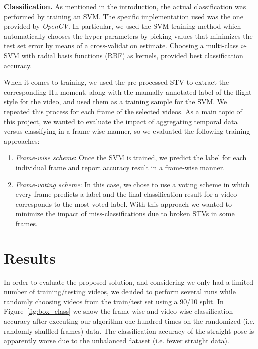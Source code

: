 \documentclass[a4paper, textwidth=18cm, textheight=24cm, top=1cm, bottom=1cm, left=1cm, right=1cm10pt]{article}
\begin{document}
\textbf{Classification.} As mentioned in the introduction, the actual classification was performed by training an SVM. The specific implementation used was the one provided by \emph{OpenCV}. In particular, we used the SVM training method which automatically chooses the hyper-parameters by picking values that minimizes the test set error by means of a cross-validation estimate. Choosing a multi-class $\nu$-SVM with radial basis functions (RBF) as kernels, provided best classification accuracy.

When it comes to training, we used the pre-processed STV to extract the corresponding Hu moment, along with the manually annotated label of the flight style for the video, and used them as a training sample for the SVM. We repeated this process for each frame of the selected videos. 
As a main topic of this project, we wanted to evaluate the impact of aggregating temporal data versus classifying in a frame-wise manner, so we evaluated the following training approaches:
\begin{enumerate}[nosep]
\item \emph{Frame-wise scheme}: Once the SVM is trained, we predict the label for each individual frame and report accuracy result in a frame-wise manner.
\item \emph{Frame-voting scheme}: In this case, we chose to use a voting scheme in which every frame predicts a label and the final classification result for a video corresponds to the most voted label. With this approach we wanted to minimize the impact of miss-classifications due to broken STVs in some frames. 
\end{enumerate}

\section{Results}

In order to evaluate the proposed solution, and considering we only had a limited number of training/testing videos, we decided to perform several runs while randomly choosing videos from the train/test set using a 90/10 split. In Figure~\ref{fig:box_class} we show the frame-wise and video-wise classification accuracy after executing our algorithm one hundred times on the randomized (i.e. randomly shuffled frames) data. The classification accuracy of the straight pose is apparently worse due to the unbalanced dataset (i.e. fewer straight data).
\end{document}
